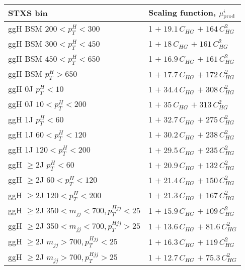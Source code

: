 \begin{tabular}{l|p{}}
    STXS bin & Scaling function, $\mu^i_{\rm{prod}}$ \\ \hline
    ggH BSM $200< p_{T}^{H} < 300$ & 1 $+\;19.1\,C_{HG}$ $+\;164\,C_{HG}^{2}$ \\
    ggH BSM $300< p_{T}^{H} < 450$ & 1 $+\;18\,C_{HG}$ $+\;161\,C_{HG}^{2}$ \\
    ggH BSM $450 < p_{T}^{H} < 650$ & 1 $+\;16.9\,C_{HG}$ $+\;161\,C_{HG}^{2}$ \\
    ggH BSM $p_{T}^{H} > 650$ & 1 $+\;17.7\,C_{HG}$ $+\;172\,C_{HG}^{2}$ \\
    ggH 0J $p_{T}^{H} < 10$ & 1 $+\;34.4\,C_{HG}$ $+\;308\,C_{HG}^{2}$ \\
    ggH 0J $10 < p_{T}^{H} < 200$ & 1 $+\;35\,C_{HG}$ $+\;313\,C_{HG}^{2}$ \\
    ggH 1J $p_{T}^{H} < 60$ & 1 $+\;32.7\,C_{HG}$ $+\;275\,C_{HG}^{2}$ \\
    ggH 1J $60 < p_{T}^{H} < 120$ & 1 $+\;30.2\,C_{HG}$ $+\;238\,C_{HG}^{2}$ \\
    ggH 1J $120 < p_{T}^{H} < 200$ & 1 $+\;29.5\,C_{HG}$ $+\;235\,C_{HG}^{2}$ \\
    ggH $\geq$2J $p_{T}^{H} < 60$ & 1 $+\;20.9\,C_{HG}$ $+\;132\,C_{HG}^{2}$ \\
    ggH $\geq$2J $60 < p_{T}^{H} < 120$ & 1 $+\;21.4\,C_{HG}$ $+\;150\,C_{HG}^{2}$ \\
    ggH $\geq$2J $120 < p_{T}^{H} < 200$ & 1 $+\;21.3\,C_{HG}$ $+\;167\,C_{HG}^{2}$ \\
    ggH $\geq$2J $350 < m_{jj} < 700, p_{T}^{Hjj} < 25$ & 1 $+\;15.9\,C_{HG}$ $+\;109\,C_{HG}^{2}$ \\
    ggH $\geq$2J $350 < m_{jj} < 700, p_{T}^{Hjj} > 25$ & 1 $+\;13.6\,C_{HG}$ $+\;81.6\,C_{HG}^{2}$ \\
    ggH $\geq$2J $m_{jj} > 700, p_{T}^{Hjj} < 25$ & 1 $+\;16.3\,C_{HG}$ $+\;119\,C_{HG}^{2}$ \\
    ggH $\geq$2J $m_{jj} > 700, p_{T}^{Hjj} > 25$ & 1 $+\;12.7\,C_{HG}$ $+\;75.3\,C_{HG}^{2}$ \\
\end{tabular}